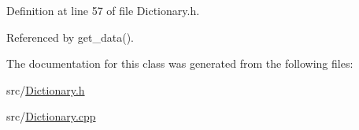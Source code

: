 Definition at line 57 of file Dictionary.\-h.



Referenced by get\-\_\-data().



The documentation for this class was generated from the following files\-:\begin{DoxyCompactItemize}
\item 
src/\hyperlink{Dictionary_8h}{Dictionary.\-h}\item 
src/\hyperlink{Dictionary_8cpp}{Dictionary.\-cpp}\end{DoxyCompactItemize}
